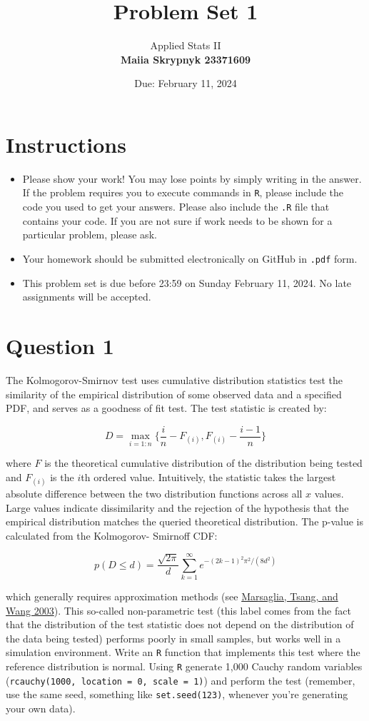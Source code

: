 \documentclass[12pt,letterpaper]{article}
\title{Problem Set 1}
\date{Due: February 11, 2024}
\author{Applied Stats II \\ \vspace{\baselineskip}
	\textbf{Maiia Skrypnyk 23371609}}
\begin{document}
	\maketitle
	\section*{Instructions}
	\begin{itemize}
	\item Please show your work! You may lose points by simply writing in the answer. If the problem requires you to execute commands in \texttt{R}, please include the code you used to get your answers. Please also include the \texttt{.R} file that contains your code. If you are not sure if work needs to be shown for a particular problem, please ask.
\item Your homework should be submitted electronically on GitHub in \texttt{.pdf} form.
\item This problem set is due before 23:59 on Sunday February 11, 2024. No late assignments will be accepted.
	\end{itemize}

	\vspace{.25cm}
\section*{Question 1} 
\vspace{.25cm}
\noindent The Kolmogorov-Smirnov test uses cumulative distribution statistics test the similarity of the empirical distribution of some observed data and a specified PDF, and serves as a goodness of fit test. The test statistic is created by:

$$D = \max_{i=1:n} \Big\{ \frac{i}{n}  - F_{(i)}, F_{(i)} - \frac{i-1}{n} \Big\}$$

\noindent where $F$ is the theoretical cumulative distribution of the distribution being tested and $F_{(i)}$ is the $i$th ordered value. Intuitively, the statistic takes the largest absolute difference between the two distribution functions across all $x$ values. Large values indicate dissimilarity and the rejection of the hypothesis that the empirical distribution matches the queried theoretical distribution. The p-value is calculated from the Kolmogorov-
Smirnoff CDF:

$$p(D \leq d)= \frac{\sqrt {2\pi}}{d} \sum _{k=1}^{\infty }e^{-(2k-1)^{2}\pi ^{2}/(8d^{2})}$$


\noindent which generally requires approximation methods (see \href{https://core.ac.uk/download/pdf/25787785.pdf}{Marsaglia, Tsang, and Wang 2003}). This so-called non-parametric test (this label comes from the fact that the distribution of the test statistic does not depend on the distribution of the data being tested) performs poorly in small samples, but works well in a simulation environment. Write an \texttt{R} function that implements this test where the reference distribution is normal. Using \texttt{R} generate 1,000 Cauchy random variables (\texttt{rcauchy(1000, location = 0, scale = 1)}) and perform the test (remember, use the same seed, something like \texttt{set.seed(123)}, whenever you're generating your own data).\\
	
\end{document}
